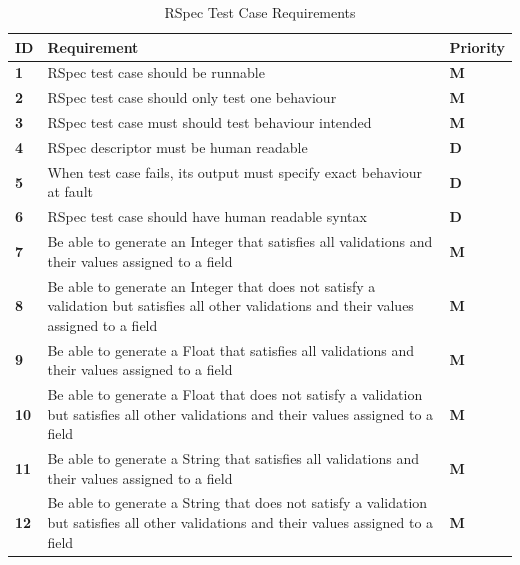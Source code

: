 \documentclass[a4paper,12pt]{article}
\begin{document}
\begin{table}
\centering
\caption{RSpec Test Case Requirements}
\label{req:2}
\begin{tabularx}{\textwidth}{|l|X|l|}
\hline
\textbf{ID} & \textbf{Requirement}                                                                                                                       & \textbf{Priority} \\ \hline
\textbf{1}  & RSpec test case should be runnable                                                                                                         & \textbf{M}        \\ \hline
\textbf{2}  & RSpec test case should only test one behaviour                                                                                             & \textbf{M}        \\ \hline
\textbf{3}  & RSpec test case must should test behaviour intended                                                                                        & \textbf{M}        \\ \hline
\textbf{4}  & RSpec descriptor must be human readable                                                                                                    & \textbf{D}        \\ \hline
\textbf{5}  & When test case fails, its output must specify exact behaviour at fault                                                                     & \textbf{D}        \\ \hline
\textbf{6}  & RSpec test case should have human readable syntax                                                                                          & \textbf{D}        \\ \hline
\textbf{7}  & Be able to generate an Integer that satisfies all validations and their values assigned to a field                                         & \textbf{M}        \\ \hline
\textbf{8}  & Be able to generate an Integer that does not satisfy a validation but satisfies all other validations and their values assigned to a field & \textbf{M}        \\ \hline
\textbf{9}  & Be able to generate a Float that satisfies all validations and their values assigned to a field                                            & \textbf{M}        \\ \hline
\textbf{10} & Be able to generate a Float that does not satisfy a validation but satisfies all other validations and their values assigned to a field    & \textbf{M}        \\ \hline
\textbf{11} & Be able to generate a String that satisfies all validations and their values assigned to a field                                           & \textbf{M}        \\ \hline
\textbf{12} & Be able to generate a String that does not satisfy a validation but satisfies all other validations and their values assigned to a field   & \textbf{M}        \\ \hline
\end{tabularx}
\end{table}
\end{document}
